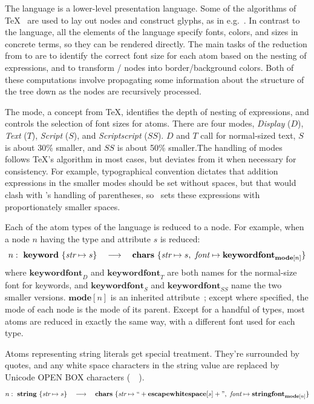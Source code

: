 The  language is a lower-level presentation language. Some of the algorithms of \TeX\ \cite{tex-math} are used to lay out nodes and construct glyphs, as in e.g.\ \cite{mathml}. In contrast to the  language, all the elements of the  language specify fonts, colors, and sizes in concrete terms, so they can be rendered directly. The main tasks of the reduction from  to  are to identify the correct font size for each atom based on the nesting of expressions, and to transform / nodes into border/background colors. Both of these computations involve propagating some information about the structure of the tree down as the nodes are recursively processed.

The mode, a concept from \TeX, identifies the depth of nesting of expressions, and controls the selection of font sizes for atoms. There are four modes, \textit{Display} ($D$), \textit{Text} ($T$), \textit{Script} ($S$), and \textit{Scriptscript} ($SS$). $D$ and $T$ call for normal-sized text, $S$ is about 30\% smaller, and $SS$ is about 50\% smaller.The handling of modes follows \TeX's algorithm in most cases, but deviates from it when necessary for consistency. For example, typographical convention dictates that addition expressions in the smaller modes should be set without spaces, but that would clash with \Meta's handling of parentheses, so \Meta\ sets these expressions with proportionately smaller spaces.

Each of the atom types of the  language is reduced to a  node. For example, when a node $n$ having the type  and  attribute $s$ is reduced:
$$
n:~{\mathbf{keyword}~\{  {\textit{str} \mapsto s}  \}} 
 	\quad \longrightarrow \quad
	{\mathbf{chars}~\{   {\textit{str} \mapsto s} ,~ {\textit{font} \mapsto  \mathbf{keywordfont}_{\mathbf{mode}[n]}}   \}}
$$
where $\mathbf{keywordfont}_D$ and $\mathbf{keywordfont}_T$ are both names for the normal-size font for keywords, and $\mathbf{keywordfont}_S$ and $\mathbf{keywordfont}_{SS}$ name the two smaller versions. $\mathbf{mode}[n]$ is an inherited attribute~\cite{attribute-grammar}; except where specified, the mode of each node is the mode of its parent. Except for a handful of types, most atoms are reduced in exactly the same way, with a different font used for each type.

\vspace{12pt}
Atoms representing string literals get special treatment. They're surrounded by quotes, and any white space characters in the string value are replaced by Unicode OPEN BOX characters (~\textvisiblespace~).
$$
n:~{\mathbf{string}~\{ {\textit{str} \mapsto s} \}} 
 	\quad \longrightarrow \quad
	{\mathbf{chars}~\{  {\textit{str} \mapsto \textrm{``} + \mathbf{escapewhitespace}[s] + \textrm{''}} ,
		~ {\textit{font} \mapsto \mathbf{stringfont}_{\mathbf{mode}[n]}}   \}}
$$

